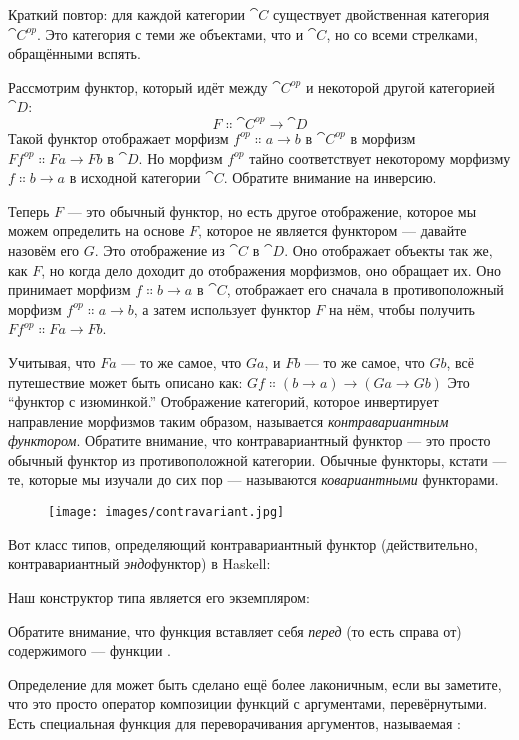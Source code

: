 Краткий повтор: для каждой категории $\cat{C}$ существует двойственная категория
$\cat{C}^\mathit{op}$. Это категория с теми же объектами, что и
$\cat{C}$, но со всеми стрелками, обращёнными вспять.

Рассмотрим функтор, который идёт между $\cat{C}^\mathit{op}$ и
некоторой другой категорией $\cat{D}$:
\[F \Colon \cat{C}^\mathit{op} \to \cat{D}\]
Такой функтор отображает морфизм $f^\mathit{op} \Colon a \to b$ в
$\cat{C}^\mathit{op}$ в морфизм $F f^\mathit{op} \Colon F a \to F b$ в $\cat{D}$. Но морфизм
$f^\mathit{op}$ тайно соответствует некоторому морфизму
$f \Colon b \to a$ в исходной категории $\cat{C}$. Обратите внимание на
инверсию.

Теперь $F$ --- это обычный функтор, но есть другое отображение, которое мы можем
определить на основе $F$, которое не является функтором --- давайте назовём его
$G$. Это отображение из $\cat{C}$ в $\cat{D}$. Оно отображает объекты так же,
как $F$, но когда дело доходит до отображения морфизмов, оно
обращает их. Оно принимает морфизм $f \Colon b \to a$ в $\cat{C}$, отображает
его сначала в противоположный морфизм $f^\mathit{op} \Colon a \to b$,
а затем использует функтор $F$ на нём, чтобы получить $F f^\mathit{op} \Colon F a \to F b$.

Учитывая, что $F a$ --- то же самое, что $G a$, и $F b$ ---
то же самое, что $G b$, всё путешествие может быть описано как: $G f \Colon (b \to a) \to (G a \to G b)$
Это ``функтор с изюминкой.'' Отображение категорий, которое инвертирует
направление морфизмов таким образом, называется
\emph{контравариантным функтором}. Обратите внимание, что контравариантный функтор ---
это просто обычный функтор из противоположной категории. Обычные функторы,
кстати --- те, которые мы изучали до сих пор --- называются
\emph{ковариантными} функторами.

\begin{figure}[H]
  \centering
  \texttt{[image: images/contravariant.jpg]}
\end{figure}

\noindent
Вот класс типов, определяющий контравариантный функтор (действительно, контравариантный
\emph{эндо}функтор) в Haskell:

Наш конструктор типа  является его экземпляром:

Обратите внимание, что функция  вставляет себя \emph{перед} (то
есть справа от) содержимого  --- функции
.

Определение  для  может быть сделано ещё
более лаконичным, если вы заметите, что это просто оператор композиции функций
с аргументами, перевёрнутыми. Есть специальная функция для переворачивания
аргументов, называемая :

